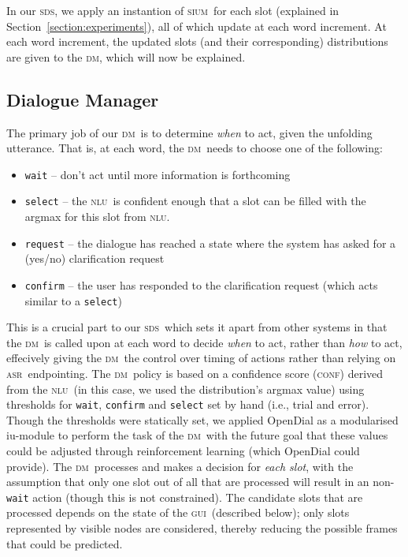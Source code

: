 \documentclass[11pt]{article}
\newcommand{\sds}[0]{\textsc{sds}}
\newcommand{\nlu}[0]{\textsc{nlu}}
\newcommand{\sium}[0]{\textsc{sium}}
\newcommand{\asr}[0]{\textsc{asr}}
\newcommand{\dm}[0]{\textsc{dm}}
\newcommand{\ui}[0]{\textsc{gui}}
\newcommand{\conf}[0]{\textsc{conf}}
\begin{document}
In our \sds, we apply an instantion of \sium\ for each slot (explained in Section~\ref{section:experiments}), all of which update at each word increment. At each word increment, the updated slots (and their corresponding) distributions are given to the \dm, which will now be explained. 

\subsection{Dialogue Manager}

The primary job of our \dm\ is to determine \emph{when} to act, given the unfolding utterance. That is, at each word, the \dm\ needs to choose one of the following:
\begin{itemize}
 \item \texttt{wait} -- don't act until more information is forthcoming
 \item \texttt{select} -- the \nlu\ is confident enough that a slot can be filled with the argmax for this slot from \nlu.
 \item \texttt{request} -- the dialogue has reached a state where the system has asked for a (yes/no) clarification request
 \item \texttt{confirm} -- the user has responded to the clarification request (which acts similar to a \texttt{select})
\end{itemize}

This is a crucial part to our \sds\ which sets it apart from other systems in that the \dm\ is called upon at each word to decide \emph{when} to act, rather than \emph{how} to act, effecively giving the \dm\ the control over timing of actions rather than relying on \asr\ endpointing. The \dm\ policy is based on a confidence score (\conf) derived from the \nlu\ (in this case, we used the distribution's argmax value) using thresholds for \texttt{wait}, \texttt{confirm} and \texttt{select} set by hand (i.e., trial and error). Though the thresholds were statically set, we applied OpenDial \cite{Lison2015a} as a modularised iu-module to perform the task of the \dm\ with the future goal that these values could be adjusted through reinforcement learning (which OpenDial could provide). The \dm\ processes and makes a decision for \emph{each slot}, with the assumption that only one slot out of all that are processed will result in an non-\texttt{wait} action (though this is not constrained). The candidate slots that are processed depends on the state of the \ui\ (described below); only slots represented by visible nodes are considered, thereby reducing the possible frames that could be predicted.
\end{document}
